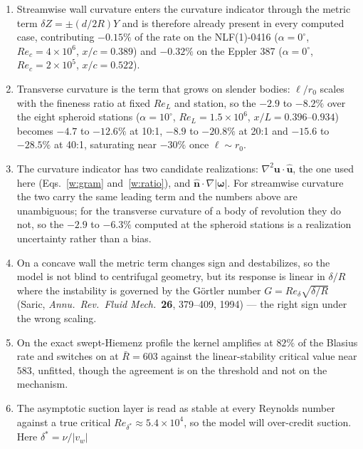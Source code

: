 \documentclass[10pt]{article}
\begin{document}
\begin{enumerate}
  $0.04$ at Falkner--Skan $\beta\!=\!+0.5$, $0.08$ at $\beta\!=\!0$, $0.12$ at
  $\beta\!=\!-0.10$ and $0.29$ at separation, so the $\ell/R\!\sim\!10^{-3}$
  terms are visible in the rate on attached layers and not near separation.
\item Streamwise wall curvature enters the curvature indicator through
  the metric term $\delta Z=\pm(d/2R)Y$ and is therefore already present
  in every computed case, contributing $-0.15\%$ of the rate on the
  NLF(1)-0416 ($\alpha\!=\!0^\circ$, $Re_c\!=\!4\times10^6$, $x/c\!=\!0.389$)
  and $-0.32\%$ on the Eppler 387 ($\alpha\!=\!0^\circ$,
  $Re_c\!=\!2\times10^5$, $x/c\!=\!0.522$).
\item Transverse curvature is the term that grows on slender bodies:
  $\ell/r_0$ scales with the fineness ratio at fixed $Re_L$ and station, so
  the $-2.9$ to $-8.2\%$ over the eight spheroid stations ($\alpha=10^\circ$,
  $Re_L=1.5\times10^6$, $x/L=0.396$--$0.934$) becomes $-4.7$ to $-12.6\%$ at
  10:1, $-8.9$ to $-20.8\%$ at 20:1 and $-15.6$ to $-28.5\%$ at 40:1,
  saturating near $-30\%$ once $\ell\!\sim\!r_0$.
\item The curvature indicator has two candidate realizations:
  $\nabla^2\mathbf u\!\cdot\!\hat{\mathbf u}$, the one used here
  (Eqs.~\eqref{w:gram} and~\eqref{w:ratio}), and
  $\hat{\mathbf n}\!\cdot\!\nabla|\boldsymbol\omega|$. For streamwise
  curvature the two carry the same leading term and the numbers above are
  unambiguous; for the transverse curvature of a body of revolution they do
  not, so the $-2.9$ to $-6.3\%$ computed at the spheroid stations is a
  realization uncertainty rather than a bias.
\item On a concave wall the metric term changes sign and destabilizes, so
  the model is not blind to centrifugal geometry, but its response is
  linear in $\delta/R$ where the instability is governed by the
  G\"ortler number $G=Re_\delta\sqrt{\delta/R}$ (Saric, \emph{Annu.\ Rev.\
  Fluid Mech.}\ \textbf{26}, 379--409, 1994) --- the right sign under the
  wrong scaling.
\item On the exact swept-Hiemenz profile the kernel amplifies at $82\%$ of
  the Blasius rate and switches on at $\bar R\!=\!603$ against the
  linear-stability critical value near $583$, unfitted, though the
  agreement is on the threshold and not on the mechanism.
\item The asymptotic suction layer is read as stable at every Reynolds
  number against a true critical $Re_{\delta^*}\!\approx\!5.4\times10^4$,
  so the model will over-credit suction. Here $\delta^*\!=\!\nu/|v_w|$

\end{enumerate}
\end{document}
